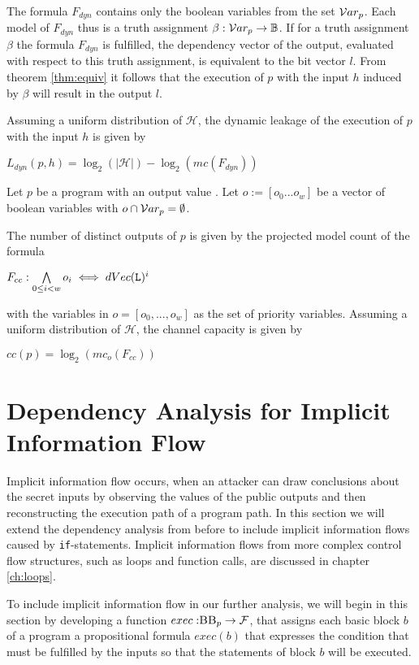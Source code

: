 The formula $F_{dyn}$ contains only the boolean variables from the set $\mathcal{V}ar_p$. Each model of $F_{dyn}$ thus is a truth assignment $\beta: \mathcal{V}ar_p \to \mathbb{B}$.
If for a truth assignment $\beta$ the formula $F_{dyn}$ is fulfilled, the dependency vector of the output, evaluated with respect to this truth assignment, is equivalent to the bit vector $l$. From theorem \ref{thm:equiv} it follows that the execution of $p$ with the input $h$ induced by $\beta$ will result in the output $l$.

Assuming a uniform distribution of $\mathcal{H}$, the dynamic leakage of the execution of $p$ with the input $h$ is given by
    \begin{center}
        $L_{dyn}(p, h) = \log_2(|\mathcal{H}|) - \log_2(mc(F_{dyn}))$
    \end{center}

\begin{lemma}
    Let $p$ be a program with an output value \Out. Let $o := [o_0 ... o_w]$ be a vector of boolean variables with $o \cap \mathcal{V}ar_p = \emptyset$.
    
    The number of distinct outputs of $p$ is given by the projected model count of the formula
    \begin{center}
        $F_{cc} : \bigwedge\limits_{0 \leq i < w} o_i \iff dVec(\mathtt{L})^i$
    \end{center}
    with the variables in $o = [o_0, ..., o_w]$ as the set of priority variables.
    Assuming a uniform distribution of $\mathcal{H}$, the channel capacity is given by
    \begin{center}
        $cc(p) = \log_2(mc_o(F_{cc}))$
    \end{center}
\end{lemma}

\section{Dependency Analysis for Implicit Information Flow}
Implicit information flow occurs, when an attacker can draw conclusions about the secret inputs by observing the values of the public outputs and then reconstructing the execution path of a program path. In this section we will extend the dependency analysis from before to include implicit information flows caused by \texttt{if}-statements. Implicit information flows from more complex control flow structures, such as loops and function calls, are discussed in chapter \ref{ch:loops}. 

To include implicit information flow in our further analysis, we will begin in this section by developing a function $exec: \mbb_p \to \mbform$, that assigns each basic block $b$ of a program a propositional formula $exec(b)$ that expresses the condition that must be fulfilled by the inputs so that the statements of block $b$ will be executed. 

